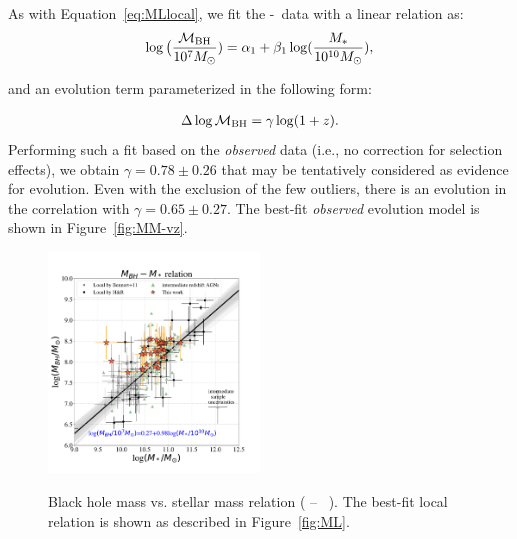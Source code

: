 \documentclass[apj]{emulateapj}
\begin{document}
As with Equation~\ref{eq:MLlocal}, we fit the \mbh-\smass\ data with a linear relation as:
\begin{eqnarray}
\label{eq:MMlocal}
\log \big( \frac{\mathcal M_{\rm BH}}{10^{7}M_{\odot}})= \alpha_1 + \beta_1 \log(\frac{M_*}{10^{10}M_{\odot}}),
\end {eqnarray}

\noindent and an evolution term parameterized in the following form:

\begin{eqnarray}
\label{eq:offset}
\Delta \log \mathcal M_{\rm BH}= \gamma \log (1 + z).
\end{eqnarray} 
Performing such a fit based on the {\it observed} data (i.e., no correction for selection effects), we obtain $\gamma  = 0.78 \pm 0.26$ that may be tentatively considered as evidence for evolution. Even with the exclusion of the few outliers, there is an evolution in the correlation with $\gamma  = 0.65 \pm 0.27$. The best-fit {\it observed} evolution model is shown in Figure~\ref{fig:MM-vz}.

\begin{figure}
\centering
{
\includegraphics[width=0.5\textwidth]{fig/MBH-Mstar.pdf}
}
\caption{\label{fig:MM} 
Black hole mass vs. stellar mass relation ( \mbh -- \smass\ ). The best-fit local relation is shown as described in Figure~\ref{fig:ML}.
}
\end{figure} 
\end{document}
